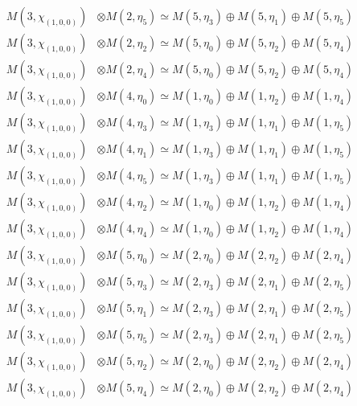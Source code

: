 \begin{align*}
M(3,\chi_{(1,0,0)}) &\otimes M(2,\eta_{5}) \simeq M(5,\eta_{3}) \oplus M(5,\eta_{1}) \oplus M(5,\eta_{5})\\
M(3,\chi_{(1,0,0)}) &\otimes M(2,\eta_{2}) \simeq M(5,\eta_{0}) \oplus M(5,\eta_{2}) \oplus M(5,\eta_{4})\\
M(3,\chi_{(1,0,0)}) &\otimes M(2,\eta_{4}) \simeq M(5,\eta_{0}) \oplus M(5,\eta_{2}) \oplus M(5,\eta_{4})\\
M(3,\chi_{(1,0,0)}) &\otimes M(4,\eta_{0}) \simeq M(1,\eta_{0}) \oplus M(1,\eta_{2}) \oplus M(1,\eta_{4})\\
M(3,\chi_{(1,0,0)}) &\otimes M(4,\eta_{3}) \simeq M(1,\eta_{3}) \oplus M(1,\eta_{1}) \oplus M(1,\eta_{5})\\
M(3,\chi_{(1,0,0)}) &\otimes M(4,\eta_{1}) \simeq M(1,\eta_{3}) \oplus M(1,\eta_{1}) \oplus M(1,\eta_{5})\\
M(3,\chi_{(1,0,0)}) &\otimes M(4,\eta_{5}) \simeq M(1,\eta_{3}) \oplus M(1,\eta_{1}) \oplus M(1,\eta_{5})\\
M(3,\chi_{(1,0,0)}) &\otimes M(4,\eta_{2}) \simeq M(1,\eta_{0}) \oplus M(1,\eta_{2}) \oplus M(1,\eta_{4})\\
M(3,\chi_{(1,0,0)}) &\otimes M(4,\eta_{4}) \simeq M(1,\eta_{0}) \oplus M(1,\eta_{2}) \oplus M(1,\eta_{4})\\
M(3,\chi_{(1,0,0)}) &\otimes M(5,\eta_{0}) \simeq M(2,\eta_{0}) \oplus M(2,\eta_{2}) \oplus M(2,\eta_{4})\\
M(3,\chi_{(1,0,0)}) &\otimes M(5,\eta_{3}) \simeq M(2,\eta_{3}) \oplus M(2,\eta_{1}) \oplus M(2,\eta_{5})\\
M(3,\chi_{(1,0,0)}) &\otimes M(5,\eta_{1}) \simeq M(2,\eta_{3}) \oplus M(2,\eta_{1}) \oplus M(2,\eta_{5})\\
M(3,\chi_{(1,0,0)}) &\otimes M(5,\eta_{5}) \simeq M(2,\eta_{3}) \oplus M(2,\eta_{1}) \oplus M(2,\eta_{5})\\
M(3,\chi_{(1,0,0)}) &\otimes M(5,\eta_{2}) \simeq M(2,\eta_{0}) \oplus M(2,\eta_{2}) \oplus M(2,\eta_{4})\\
M(3,\chi_{(1,0,0)}) &\otimes M(5,\eta_{4}) \simeq M(2,\eta_{0}) \oplus M(2,\eta_{2}) \oplus M(2,\eta_{4})\\
\end{align*}

